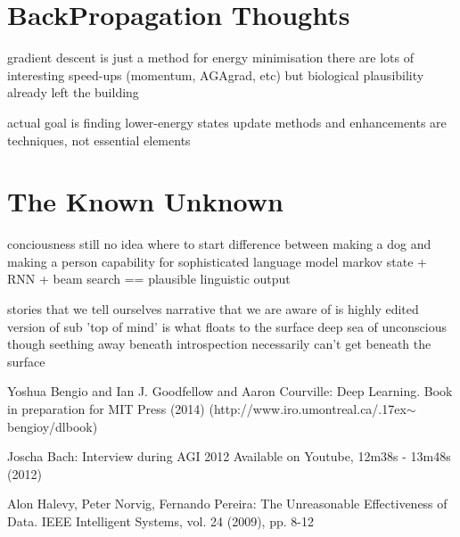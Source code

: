 \documentclass[citeauthoryear]{llncs}
\begin{document}
\section{BackPropagation Thoughts}
  gradient descent is just a method for energy minimisation
    there are lots of interesting speed-ups (momentum, AGAgrad, etc)
      but biological plausibility already left the building
      
    actual goal is finding lower-energy states
      update methods and enhancements are techniques, not essential elements


\section{The Known Unknown}

conciousness 
  still no idea where to start
  difference between making a dog and making a person
    capability for sophisticated language model
      markov state + RNN + beam search == plausible linguistic output
  
  stories that we tell ourselves
    narrative that we are aware of is highly edited version of sub
      'top of mind' is what floats to the surface
      deep sea of unconscious though seething away beneath
  introspection necessarily can't get beneath the surface

%
%
\begin{thebibliography}{}
%
\newcommand{\mytilde}{\raise.17ex\hbox{$\scriptstyle\mathtt{\sim}$}}

Yoshua Bengio and Ian J. Goodfellow and Aaron Courville:
Deep Learning.
Book in preparation for MIT Press (2014)
(http://www.iro.umontreal.ca/\mytilde{}bengioy/dlbook)

Joscha Bach:
Interview during AGI 2012
Available on Youtube, 12m38s - 13m48s (2012)

Alon Halevy, Peter Norvig, Fernando Pereira:
The Unreasonable Effectiveness of Data.
IEEE Intelligent Systems, vol. 24 (2009), pp. 8-12

%
%
%
%

\end{thebibliography}
\end{document}
